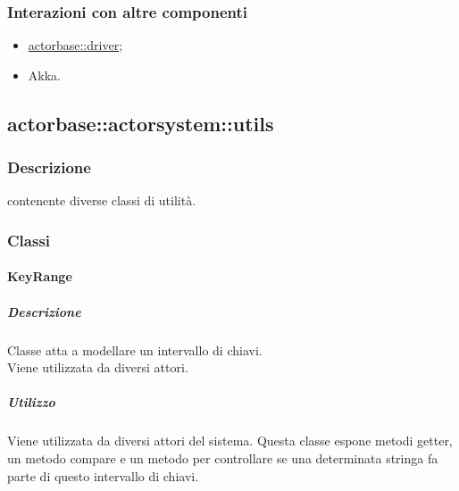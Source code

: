 \documentclass{scalatekids-article}
\begin{document}
\subsubsection{Interazioni con altre componenti}

\begin{itemize}
\item \hyperref[sec:actorbase::driver]{actorbase::driver};
\item Akka.
\end{itemize}


\subsection{actorbase::actorsystem::utils}
\label{sec:actorbase::actorsystem::utils}


\subsubsection{Descrizione}
 contenente diverse classi di utilità.

\subsubsection{Classi}


\paragraph{KeyRange}
\label{sec:actorbase::actorsystem::utils::KeyRange}

\subparagraph{Descrizione}
Classe atta a modellare un intervallo di chiavi.\\Viene utilizzata da diversi
attori.

\subparagraph{Utilizzo}
Viene utilizzata da diversi attori del sistema. Questa classe espone metodi
getter, un metodo compare e un metodo per controllare se una determinata
stringa fa parte di questo intervallo di chiavi.
\end{document}
